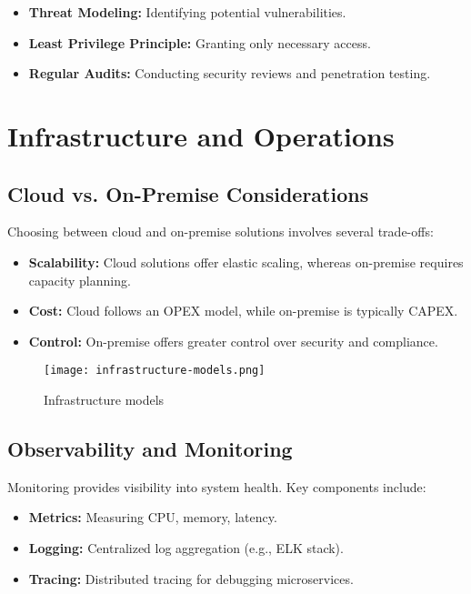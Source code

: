 \begin{itemize}
    \item \textbf{Threat Modeling:} Identifying potential vulnerabilities.
    \item \textbf{Least Privilege Principle:} Granting only necessary access.
    \item \textbf{Regular Audits:} Conducting security reviews and penetration testing.
\end{itemize}

\section{Infrastructure and Operations}

\subsection{Cloud vs. On-Premise Considerations}

Choosing between cloud and on-premise solutions involves several trade-offs:

\begin{itemize}
    \item \textbf{Scalability:} Cloud solutions offer elastic scaling, whereas on-premise requires capacity planning.
    \item \textbf{Cost:} Cloud follows an OPEX model, while on-premise is typically CAPEX.
    \item \textbf{Control:} On-premise offers greater control over security and compliance.
\end{itemize}

\begin{figure}[h]
    \centering
    \texttt{[image: infrastructure-models.png]}
    \caption{Infrastructure models}
\end{figure}

\subsection{Observability and Monitoring}

Monitoring provides visibility into system health. Key components include:

\begin{itemize}
    \item \textbf{Metrics:} Measuring CPU, memory, latency.
    \item \textbf{Logging:} Centralized log aggregation (e.g., ELK stack).
    \item \textbf{Tracing:} Distributed tracing for debugging microservices.
\end{itemize}

